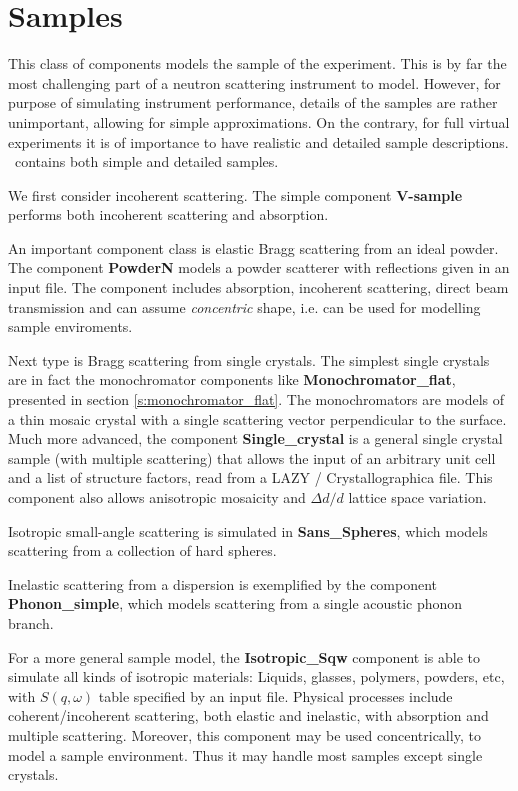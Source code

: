 \chapter{Samples}
\label{c:samples}

This class of components models the sample of the experiment.
This is by far the most challenging part of a neutron scattering
instrument to model. However, for purpose of simulating
instrument performance, details of the samples are rather unimportant,
allowing for simple approximations. On the contrary, for full
virtual experiments it is of importance to have realistic and
detailed sample descriptions. \MCS\ contains both simple and detailed
samples.

We first consider incoherent scattering. The simple component {\bf V-sample}
performs both incoherent scattering and absorption.

An important component class is elastic Bragg scattering from an ideal powder.
The component {\bf PowderN} models a powder scatterer with reflections
given in an input file.
The component includes absorption, incoherent scattering, direct beam 
transmission and can assume \emph{concentric} shape, i.e. can be used 
for modelling sample enviroments.

Next type is Bragg scattering from single crystals.
The simplest single crystals are in fact the monochromator components
like {\bf Monochromator\_flat}, presented in section \ref{s:monochromator_flat}.
The monochromators are models of a thin mosaic crystal
with a single scattering vector perpendicular to the surface.
Much more advanced, the component {\bf Single\_crystal}
is a general single crystal sample (with multiple scattering) that allows
the input of an arbitrary unit cell and a list of structure factors, read
from a LAZY / Crystallographica file.
This component also allows anisotropic mosaicity
and $\Delta d/d$ lattice space variation.

Isotropic small-angle scattering is simulated in {\bf Sans\_Spheres},
which models scattering from a collection of hard spheres.

Inelastic scattering from a dispersion is exemplified by
the component {\bf Phonon\_simple}, which models
scattering from a single acoustic phonon branch.

For a more general sample model, the {\bf Isotropic\_Sqw} component
is able to simulate all kinds of isotropic materials:
Liquids, glasses, polymers, powders, etc, with $S(q,\omega)$ table
specified by an input file.
Physical processes include coherent/incoherent scattering,
both elastic and inelastic, with absorption and multiple scattering.
Moreover, this component may be used concentrically,
to model a sample environment.
Thus it may handle most samples except single crystals.

